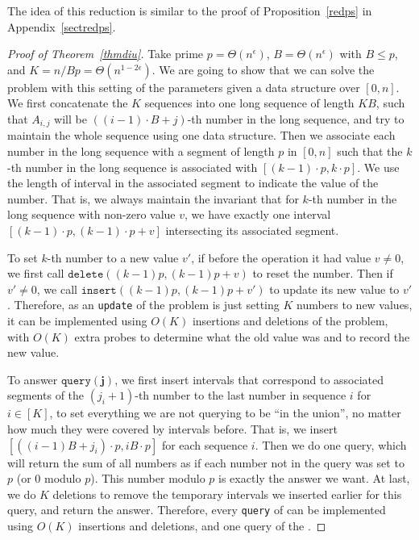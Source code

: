 \documentclass[11pt]{article}
\begin{document}
The idea of this reduction is similar to the proof of Proposition~\ref{redps} in Appendix~\ref{sectredps}. 

\begin{proof}[Proof of Theorem~\ref{thmdiu}]

Take prime $p=\Theta(n^{\epsilon})$, $B=\Theta(n^{\epsilon})$ with $B\leq p$, and $K=n/Bp=\Theta(n^{1-2\epsilon})$. We are going to show that we can solve the \bps{} problem with this setting of the parameters given a \diu{} data structure over $[0, n]$. We first concatenate the $K$ sequences into one long sequence of length $KB$, such that $A_{i,j}$ will be $((i-1)\cdot B+j)$-th number in the long sequence, and try to maintain the whole sequence using one \diu{} data structure. Then we associate each number in the long sequence with a segment of length $p$ in $[0, n]$ such that the $k$-th number in the long sequence is associated with $[(k-1)\cdot p,k\cdot p]$. We use the length of interval in the associated segment to indicate the value of the number. That is, we always maintain the invariant that for $k$-th number in the long sequence with non-zero value $v$, we have exactly one interval $[(k-1)\cdot p, (k-1)\cdot p+v]$ intersecting its associated segment. 

To set $k$-th number to a new value $v'$, if before the operation it had value $v\neq 0$, we first call $\texttt{delete}((k-1)p, (k-1)p+v)$ to reset the number. Then if $v'\neq 0$, we call $\texttt{insert}((k-1)p, (k-1)p+v')$ to update its new value to $v'$. Therefore, as an \verb+update+ of the \bps{} problem is just setting $K$ numbers to new values, it can be implemented using $O(K)$ insertions and deletions of the \diu{} problem, with $O(K)$ extra probes to determine what the old value was and to record the new value.

To answer $\texttt{query}(\mathbf{j})$, we first insert intervals that correspond to associated segments of the $(j_i+1)$-th number to the last number in sequence $i$ for $i\in [K]$, to set everything we are not querying to be ``in the union'', no matter how much they were covered by intervals before. That is, we insert $[((i-1)B+j_i)\cdot p, iB\cdot p]$ for each sequence $i$. Then we do one query, which will return the sum of all numbers as if each number not in the query was set to $p$ (or $0$ modulo $p$). This number modulo $p$ is exactly the answer we want. At last, we do $K$ deletions to remove the temporary intervals we inserted earlier for this query, and return the answer. Therefore, every \verb+query+ of \bps{} can be implemented using $O(K)$ insertions and deletions, and one query of the \diu{}. 


\end{proof}
\end{document}
